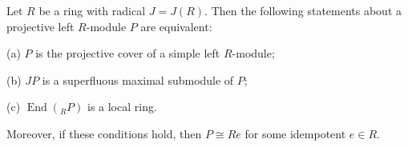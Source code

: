 Let $R$ be a ring with radical $J = J(R)$. Then the following statements about a projective left $R$-module $P$ are equivalent:

(a) $P$ is the projective cover of a simple left $R$-module;

(b) $JP$ is a superfluous maximal submodule of $P$;

(c) $\operatorname{End}({}_R P)$ is a local ring.

Moreover, if these conditions hold, then $P \cong Re$ for some idempotent $e \in R$.
